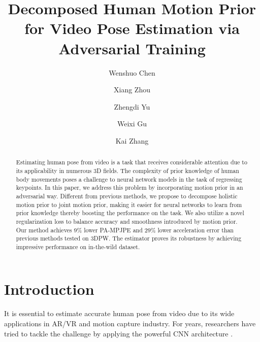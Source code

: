 \documentclass{svproc}
\begin{document}
\mainmatter              \title{Decomposed Human Motion Prior for Video Pose Estimation via Adversarial Training}
  \author{Wenshuo Chen \and Xiang Zhou \and
Zhengdi Yu \and Weixi Gu \inst{3\dagger} \and Kai Zhang}
 


\maketitle              

\begin{abstract}
Estimating human pose from video is a task that receives considerable attention due to its applicability in numerous 3D fields. The complexity of prior knowledge of human body movements poses a challenge to neural network models in the task of regressing keypoints. In this paper, we address this problem by incorporating motion prior in an adversarial way. Different from previous methods, we propose to decompose holistic motion prior to joint motion prior, making it easier for neural networks to learn from prior knowledge thereby boosting the performance on the task. We also utilize a novel regularization loss to balance accuracy and smoothness introduced by motion prior. Our method achieves 9\% lower PA-MPJPE and 29\% lower acceleration error than previous methods tested on 3DPW. The estimator proves its robustness by achieving impressive performance on in-the-wild dataset.
\end{abstract}
\section{Introduction}
\label{sec:intro}
It is essential to estimate accurate human pose from video due to its wide applications in AR/VR and motion capture industry. For years, researchers have tried to tackle the challenge by applying the powerful CNN architecture \cite{kocabas2020vibe, rempe2021humor,yuan2022glamr}. 
\end{document}
